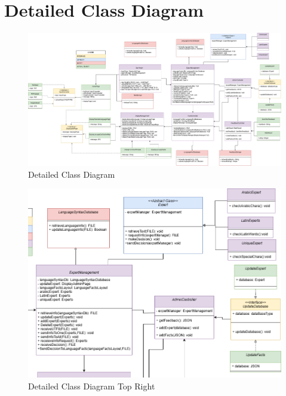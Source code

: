 \section{Detailed Class Diagram}
\label{sec:detailed_class_diagram}

\begin{figure}[H]
	\centering
	\includegraphics[width=\textwidth, height=\textheight, keepaspectratio]{Section4/images/LangufiyClassDiagramV5.png}
	\caption{Detailed Class Diagram}
	\label{DetailedClassDiagram}
\end{figure}

\begin{figure}[H]
	\centering
	\includegraphics[width=\textwidth, height=\textheight, keepaspectratio]{Section4/images/LangufiyClassDiagramV6TR.png}
	\caption{Detailed Class Diagram Top Right}
	\label{DetailedClassDiagramQ1}
\end{figure}

